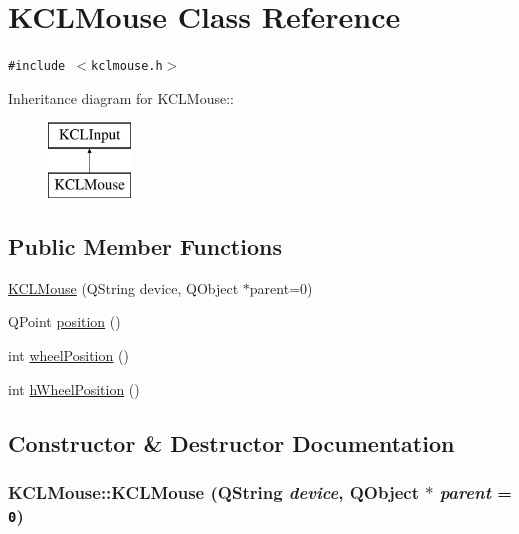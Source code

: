 \hypertarget{class_k_c_l_mouse}{
\section{KCLMouse Class Reference}
\label{class_k_c_l_mouse}
}
{\tt \#include $<$kclmouse.h$>$}

Inheritance diagram for KCLMouse::\begin{figure}[H]
\begin{center}
\leavevmode
\includegraphics[height=2cm]{class_k_c_l_mouse}
\end{center}
\end{figure}
\subsection*{Public Member Functions}
\begin{CompactItemize}
\item 
\hyperlink{class_k_c_l_mouse_b06e2fabbfd2459d9c335f3dc498f53b}{KCLMouse} (QString device, QObject $\ast$parent=0)
\item 
QPoint \hyperlink{class_k_c_l_mouse_0385a723fb0ec739f8943627764a53fb}{position} ()
\item 
int \hyperlink{class_k_c_l_mouse_a913b0b518584db62a341ad75ee49119}{wheelPosition} ()
\item 
int \hyperlink{class_k_c_l_mouse_75f221554270e5bcffdf6b671a62f01a}{hWheelPosition} ()
\end{CompactItemize}


\subsection{Constructor \& Destructor Documentation}
\hypertarget{class_k_c_l_mouse_b06e2fabbfd2459d9c335f3dc498f53b}{
\subsubsection[{KCLMouse}]{\setlength{\rightskip}{0pt plus 5cm}KCLMouse::KCLMouse (QString {\em device}, \/  QObject $\ast$ {\em parent} = {\tt 0})}}
\label{class_k_c_l_mouse_b06e2fabbfd2459d9c335f3dc498f53b}




